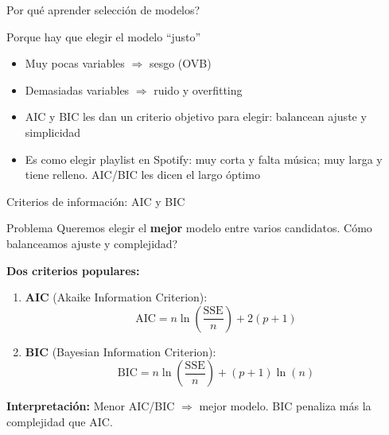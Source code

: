 \documentclass[aspectratio=169, 11pt]{beamer}
\begin{document}
\begin{frame}{\textquestiondown{}Por qu\'e aprender selecci\'on de modelos?}
\begin{exampleblock}{Porque hay que elegir el modelo ``justo''}
\small
\begin{itemize}\setlength{\itemsep}{2pt}
  \item Muy pocas variables $\Rightarrow$ sesgo (OVB)
  \item Demasiadas variables $\Rightarrow$ ruido y overfitting
  \item AIC y BIC les dan un criterio objetivo para elegir: balancean ajuste y simplicidad
  \item Es como elegir playlist en Spotify: muy corta y falta m\'usica; muy larga y tiene relleno. AIC/BIC les dicen el largo \'optimo
\end{itemize}
\end{exampleblock}
\end{frame}

\begin{frame}{Criterios de informaci\'on: AIC y BIC}
\begin{block}{Problema}
Queremos elegir el \textbf{mejor} modelo entre varios candidatos. \textquestiondown C\'omo balanceamos ajuste y complejidad?
\end{block}

\vspace{0.1cm}
\textbf{Dos criterios populares:}
\begin{enumerate}
  \item \textbf{AIC} (Akaike Information Criterion):
  \[
  \text{AIC} = n \ln\!\left(\frac{\text{SSE}}{n}\right) + 2(p + 1)
  \]

  \item \textbf{BIC} (Bayesian Information Criterion):
  \[
  \text{BIC} = n \ln\!\left(\frac{\text{SSE}}{n}\right) + (p + 1) \ln(n)
  \]
\end{enumerate}
\vspace{-2pt}
{\small \textbf{Interpretaci\'on:} Menor AIC/BIC $\Rightarrow$ mejor modelo. BIC penaliza m\'as la complejidad que AIC.}
\end{frame}
\end{document}
